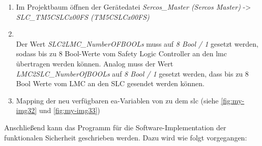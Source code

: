 \documentclass[../../../Bachelorarbeit.tex]{subfiles}
\begin{document}
\begin{enumerate}
    \item Im Projektbaum öffnen der Gerätedatei \textit{Sercos\_Master (Sercos Master)} -> \\ \textit{SLC\_TM5CSLCx00FS (TM5CSLCx00FS)}
    \item \begin{minipage}[t]{\linewidth}
        \raggedright
        \label{fig:my-img40}
    \end{minipage}
    \bigskip \\
    Der Wert \textit{SLC2LMC\_NumberOFBOOLs} muss auf \textit{8 Bool / 1} gesetzt werden, sodass bis zu 8 Bool-Werte vom Safety Logic Controller an den \acs{lmc} übertragen werden können. Analog muss der Wert \textit{LMC2SLC\_NumberOfBOOLs} auf \textit{8 Bool / 1} gesetzt werden, dass bis zu 8 Bool Werte vom \acs{LMC} an den \acs{SLC} gesendet werden können.
    \item Mapping der neu verfügbaren \acs{ea}-Variablen von \bzw zu dem \acs{slc} (siehe \autoref{fig:my-img32} und \autoref{fig:my-img33})
\end{enumerate}

Anschließend kann das Programm für die Software-Implementation der funktionalen Sicherheit geschrieben werden. Dazu wird wie folgt vorgegangen:
\end{document}
